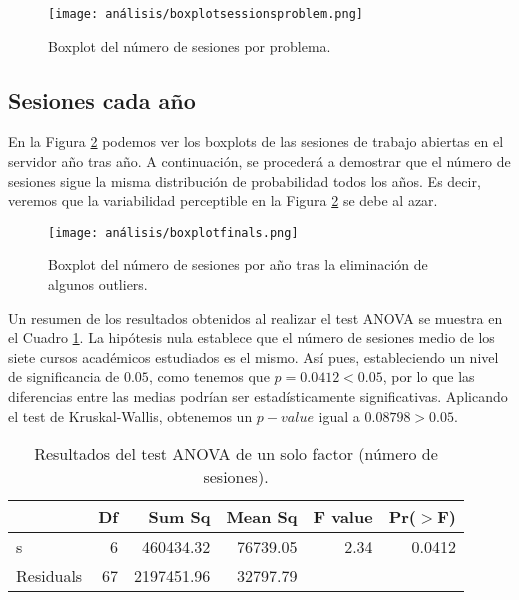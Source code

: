 \begin{figure}[H]
    \centering
    \texttt{[image: análisis/boxplotsessionsproblem.png]}
    \caption{Boxplot del número de sesiones por problema.}
    \label{fig:boxplotsessionsproblem}
\end{figure}

\subsection{Sesiones cada año}\label{sec:ANOVANumSessions}

En la Figura \ref{fig:boxplotsessionsyear} podemos ver los boxplots de las sesiones de trabajo abiertas en el servidor año tras año. A continuación, se procederá a demostrar que el número de sesiones sigue la misma distribución de probabilidad todos los años. Es decir, veremos que la variabilidad perceptible en la Figura \ref{fig:boxplotsessionsyear} se debe al azar.

\begin{figure}[H]
    \centering
    \texttt{[image: análisis/boxplotfinals.png]}
    \caption{Boxplot del número de sesiones por año tras la eliminación de algunos outliers.}
    \label{fig:boxplotsessionsyear}
\end{figure}

Un resumen de los resultados obtenidos al realizar el test ANOVA se muestra en el Cuadro \ref{tab:ANOVAnumsessions}. La hipótesis nula establece que el número de sesiones medio de los siete cursos académicos estudiados es el mismo. Así pues, estableciendo un nivel de significancia de $0.05$, como tenemos que $p = 0.0412 < 0.05$, por lo que las diferencias entre las medias podrían ser estadísticamente significativas. Aplicando el test de Kruskal-Wallis, obtenemos un $p-value$ igual a $0.08798 > 0.05$.

\begin{table}[H]
\centering
\caption{Resultados del test ANOVA de un solo factor (número de sesiones).}
\label{tab:ANOVAnumsessions}
\begin{tabular}{lrrrrr}
  \hline
 & Df & Sum Sq & Mean Sq & F value & Pr($>$F) \\ 
  \hline
s & 6 & 460434.32 & 76739.05 & 2.34 & 0.0412 \\ 
  Residuals         & 67 & 2197451.96 & 32797.79 &  &  \\ 
   \hline
\end{tabular}
\end{table}

